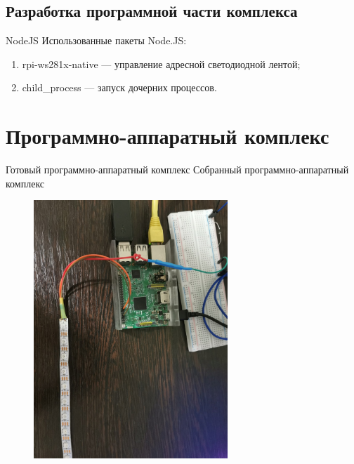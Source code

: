 \subsection{Разработка программной части комплекса}

\begin{frame}{NodeJS}
  Использованные пакеты Node.JS:

  \begin{enumerate}
    \item rpi-ws281x-native --- управление адресной светодиодной лентой;
    \item child\_process --- запуск дочерних процессов.
  \end{enumerate}
\end{frame}

\section{Программно-аппаратный комплекс}

\begin{frame}{Готовый программно-аппаратный комплекс}
  Собранный программно-аппаратный комплекс

  \begin{figure}[H]
    \centering
    \includegraphics[angle=90, width=0.65\textwidth]{assets/images/Полная схема.jpg}
  \end{figure}
\end{frame}

